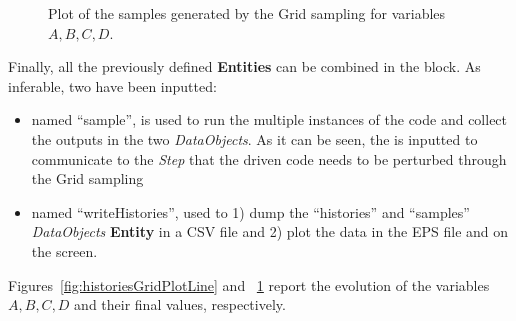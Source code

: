 \begin{enumerate}
\begin{figure}[h!]
  \caption{Plot of the samples generated by the Grid sampling for variables $A,B,C,D$.}
  \label{fig:samplesGridPlotLine}
 \end{figure}
   Finally, all the previously defined \textbf{Entities} can be combined in
   the  block. As inferable,
   two  have been inputted:
   \begin{itemize}
     \item {} named ``sample'', is used to run the multiple
     instances of the code and
     collect the outputs in the two \textit{DataObjects}. As it can be
     seen, the  is inputted to communicate to the
     \textit{Step} that the driven code needs to
     be perturbed through the Grid sampling
     \item  {} named ``writeHistories'', used to 1) dump
     the ``histories'' and ``samples'' \textit{DataObjects}
     \textbf{Entity} in a CSV file and 2) plot the data in the EPS file and
     on the screen.
   \end{itemize}
\end{enumerate}
 Figures~\ref{fig:historiesGridPlotLine} and ~\ref{fig:samplesGridPlotLine}  report the evolution of the
 variables $A,B,C,D$ and their final values, respectively.

